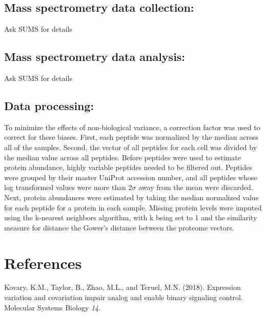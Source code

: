 \documentclass[11pt,]{article}
\begin{document}
\hypertarget{mass-spectrometry-data-collection}{%
\subsection{Mass spectrometry data
collection:}\label{mass-spectrometry-data-collection}}

Ask SUMS for details

\hypertarget{mass-spectrometry-data-analysis}{%
\subsection{Mass spectrometry data
analysis:}\label{mass-spectrometry-data-analysis}}

Ask SUMS for details

\hypertarget{data-processing}{%
\subsection{Data processing:}\label{data-processing}}

To minimize the effects of non-biological variance, a correction factor
was used to correct for these biases. First, each peptide was normalized
by the median across all of the samples. Second, the vector of all
peptides for each cell was divided by the median value across all
peptides. Before peptides were used to estimate protein abundance,
highly variable peptides needed to be filtered out. Peptides were
grouped by their master UniProt accession number, and all peptides whose
log transformed values were more than 2\(\sigma\) away from the mean
were discarded. Next, protein abundances were estimated by taking the
median normalized value for each peptide for a protein in each sample.
Missing protein levels were imputed using the k-nearest neighbors
algorithm, with k being set to 1 and the similarity measure for distance
the Gower's distance between the proteome vectors.

\clearpage

\hypertarget{references}{%
\section{References}\label{references}}

\hypertarget{refs}{}
\leavevmode\hypertarget{ref-Kovary_2018}{}%
Kovary, K.M., Taylor, B., Zhao, M.L., and Teruel, M.N. (2018).
Expression variation and covariation impair analog and enable binary
signaling control. Molecular Systems Biology \emph{14}.
\end{document}
